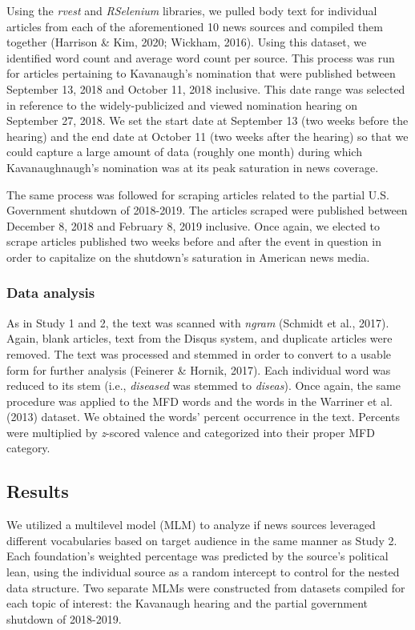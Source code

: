 \documentclass[
  man,floatsintext]{apa6}
\begin{document}
Using the \emph{rvest} and \emph{RSelenium} libraries, we pulled body text for
individual articles from each of the aforementioned 10 news sources and
compiled them together (Harrison \& Kim, 2020; Wickham, 2016). Using
this dataset, we identified word count and average word count per
source. This process was run for articles pertaining to Kavanaugh's
nomination that were published between September 13, 2018 and October
11, 2018 inclusive. This date range was selected in reference to the
widely-publicized and viewed nomination hearing on September 27, 2018.
We set the start date at September 13 (two weeks before the hearing) and
the end date at October 11 (two weeks after the hearing) so that we
could capture a large amount of data (roughly one month) during which
Kavanaughnaugh's nomination was at its peak saturation in news coverage.

The same process was followed for scraping articles related to the
partial U.S. Government shutdown of 2018-2019. The articles scraped were
published between December 8, 2018 and February 8, 2019 inclusive. Once
again, we elected to scrape articles published two weeks before and
after the event in question in order to capitalize on the shutdown's
saturation in American news media.

\subsubsection{Data analysis}\label{data-analysis-1}

As in Study 1 and 2, the text was scanned with \emph{ngram} (Schmidt et al., 2017). Again,
blank articles, text from the Disqus system, and duplicate articles were
removed. The text was processed and stemmed in order to convert to a
usable form for further analysis (Feinerer \& Hornik, 2017). Each individual word
was reduced to its stem (i.e., \emph{diseased} was stemmed to \emph{diseas}). Once
again, the same procedure was applied to the MFD words and the words in
the Warriner et al. (2013) dataset. We obtained the words' percent occurrence in
the text. Percents were multiplied by \emph{z}-scored valence and categorized
into their proper MFD category.

\subsection{Results}\label{results-4}

We utilized a multilevel model (MLM) to analyze if news sources
leveraged different vocabularies based on target audience in the same
manner as Study 2. Each foundation's weighted percentage was predicted
by the source's political lean, using the individual source as a random
intercept to control for the nested data structure. Two separate MLMs
were constructed from datasets compiled for each topic of interest: the
Kavanaugh hearing and the partial government shutdown of 2018-2019.
\end{document}
